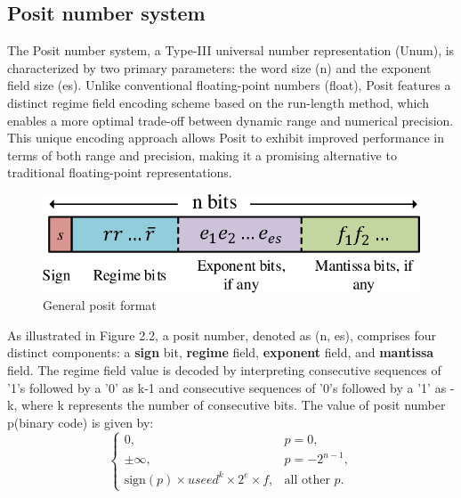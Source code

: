\subsection{Posit number system}
The Posit number system, a Type-III universal number representation (Unum), is characterized by two primary parameters: the word size (n) and the exponent field size (es). Unlike conventional floating-point numbers (float), Posit features a distinct regime field encoding scheme based on the run-length method, which enables a more optimal trade-off between dynamic range and numerical precision. This unique encoding approach allows Posit to exhibit improved performance in terms of both range and precision, making it a promising alternative to traditional floating-point representations.\\
\begin{figure}[h]
    \centering
    \includegraphics[width=\linewidth]{../figures/posit.png}
    \caption{General posit format }
\end{figure}
As illustrated in Figure 2.2, a posit number, denoted as (n, es), comprises four distinct components: a \textbf{sign} bit, \textbf{regime} field, \textbf{exponent} field, and \textbf{mantissa} field. The regime field value is decoded by interpreting consecutive sequences of '1's followed by a '0' as k-1 and consecutive sequences of '0's followed by a '1' as -k, where k represents the number of consecutive bits. The value of posit number p(binary code) is given by:
\begin{equation}
\left\{
\begin{array}{ll}
0, & p = 0, \\
\pm\infty, & p = -2^{n-1}, \\
\text{sign}(p) \times useed^k \times 2^e \times f, & \text{all other } p.
\end{array}
\right.
\end{equation}
